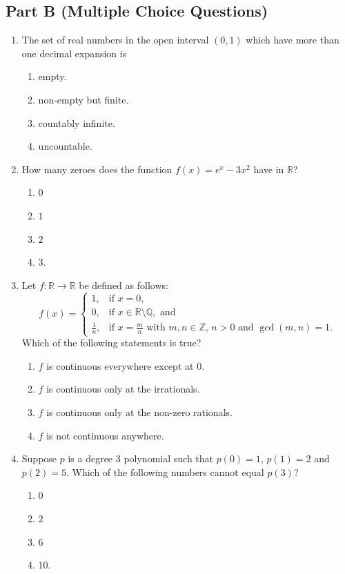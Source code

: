 \documentclass[11pt, a4paper]{article}
\begin{document}
\subsection*{Part B (Multiple Choice Questions)}
\begin{enumerate}
  \item The set of real numbers in the open interval $(0,1)$ which have more than one decimal expansion is
  \begin{enumerate}[label=(\alph*)]
    \item empty.
    \item non-empty but finite.
    \item countably infinite.
    \item uncountable.
  \end{enumerate}

  \item How many zeroes does the function $f(x) = e^x - 3x^2$ have in $\mathbb{R}$?
  \begin{enumerate}[label=(\alph*)]
    \item $0$
    \item $1$
    \item $2$
    \item $3$.
  \end{enumerate}

  \item Let $f: \mathbb{R} \to \mathbb{R}$ be defined as follows:
  \[
    f(x) = \begin{cases}
      1, & \text{if } x = 0, \\
      0, & \text{if } x \in \mathbb{R} \setminus \mathbb{Q}, \text{ and} \\
      \frac{1}{n}, & \text{if } x = \frac{m}{n} \text{ with } m, n \in \mathbb{Z}, \, n > 0 \text{ and } \gcd(m,n) = 1.
    \end{cases}
  \]
  Which of the following statements is true?
  \begin{enumerate}[label=(\alph*)]
    \item $f$ is continuous everywhere except at $0$.
    \item $f$ is continuous only at the irrationals.
    \item $f$ is continuous only at the non-zero rationals.
    \item $f$ is not continuous anywhere.
  \end{enumerate}

  \item Suppose $p$ is a degree $3$ polynomial such that $p(0) = 1$, $p(1) = 2$ and $p(2) = 5$. Which of the following numbers cannot equal $p(3)$?
  \begin{enumerate}[label=(\alph*)]
    \item $0$
    \item $2$
    \item $6$
    \item $10$.
  \end{enumerate}


\end{enumerate}
\end{document}
